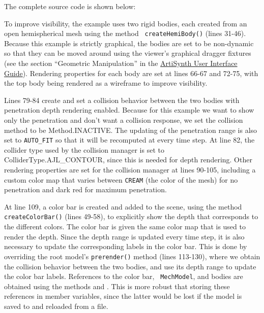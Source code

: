The complete source code is shown below:
%
\lstset{numbers=left}

\lstset{numbers=none} 

To improve visibility, the example uses two rigid bodies, each created
from an open hemispherical mesh using the method {\tt
createHemiBody()} (lines 31-46). Because this example is strictly
graphical, the bodies are set to be non-dynamic so that they can be
moved around using the viewer's graphical dragger fixtures (see the
section ``Geometric Manipulation'' in the
\href{\artisynthDocBase/html/uiguide/uiguide.html}{ArtiSynth User
Interface Guide}). Rendering properties for each body are set at lines
66-67 and 72-75, with the top body being rendered as a wireframe to
improve visibility.

Lines 79-84 create and set a collision behavior between the two bodies
with penetration depth rendering enabled. Because for this example we
want to show only the penetration and don't want a collision response,
we set the collision method to be %
{Method.INACTIVE}. The updating of the penetration range is also set
to {\tt AUTO\_FIT} so that it will be recomputed at every time step.
At line 82, the collider type used by the collision manager is set to
%
{ColliderType.AJL\_CONTOUR}, since this is needed for depth rendering.
Other rendering properties are set for the collision manager at lines
90-105, including a custom color map that varies between {\tt CREAM}
(the color of the mesh) for no penetration and dark red for maximum
penetration.

At line 109, a color bar is created and added to the scene, using the
method {\tt createColorBar()} (lines 49-58), to explicitly show the
depth that corresponds to the different colors. The color bar is given
the same color map that is used to render the depth. Since the depth
range is updated every time step, it is also necessary to update the
corresponding labels in the color bar. This is done by overriding the
root model's {\tt prerender()} method (lines 113-130), where we obtain
the collision behavior between the two bodies, and use its depth range
to update the color bar labels. References to the color bar, {\tt
MechModel}, and bodies are obtained using the
 methods
 and
.
This is more robust that storing these references in  member
variables, since the latter would be lost if the model is saved to and
reloaded from a file.

